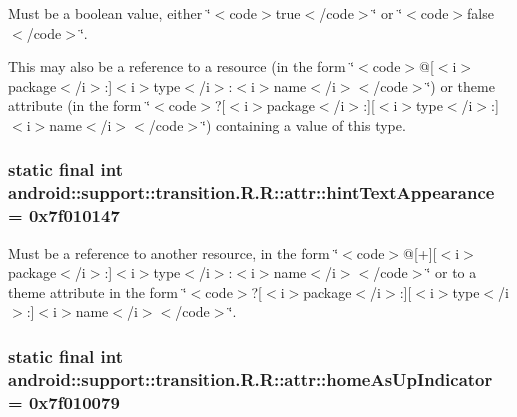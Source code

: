 Must be a boolean value, either \char`\"{}$<$code$>$true$<$/code$>$\char`\"{} or \char`\"{}$<$code$>$false$<$/code$>$\char`\"{}. 

This may also be a reference to a resource (in the form \char`\"{}$<$code$>$@\mbox{[}$<$i$>$package$<$/i$>$:\mbox{]}$<$i$>$type$<$/i$>$:$<$i$>$name$<$/i$>$$<$/code$>$\char`\"{}) or theme attribute (in the form \char`\"{}$<$code$>$?\mbox{[}$<$i$>$package$<$/i$>$:\mbox{]}\mbox{[}$<$i$>$type$<$/i$>$:\mbox{]}$<$i$>$name$<$/i$>$$<$/code$>$\char`\"{}) containing a value of this type. \hypertarget{classandroid_1_1support_1_1transition_1_1_r_1_1attr_cebf97defcf74a193b4e4dfb6aa6bc21}{
\subsubsection[{hintTextAppearance}]{\setlength{\rightskip}{0pt plus 5cm}static final int android::support::transition.R.R::attr::hintTextAppearance = 0x7f010147}}
\label{classandroid_1_1support_1_1transition_1_1_r_1_1attr_cebf97defcf74a193b4e4dfb6aa6bc21}


Must be a reference to another resource, in the form \char`\"{}$<$code$>$@\mbox{[}+\mbox{]}\mbox{[}$<$i$>$package$<$/i$>$:\mbox{]}$<$i$>$type$<$/i$>$:$<$i$>$name$<$/i$>$$<$/code$>$\char`\"{} or to a theme attribute in the form \char`\"{}$<$code$>$?\mbox{[}$<$i$>$package$<$/i$>$:\mbox{]}\mbox{[}$<$i$>$type$<$/i$>$:\mbox{]}$<$i$>$name$<$/i$>$$<$/code$>$\char`\"{}. \hypertarget{classandroid_1_1support_1_1transition_1_1_r_1_1attr_e05e5e3faece6a8edf933e4130bc88e3}{
\subsubsection[{homeAsUpIndicator}]{\setlength{\rightskip}{0pt plus 5cm}static final int android::support::transition.R.R::attr::homeAsUpIndicator = 0x7f010079}}
\label{classandroid_1_1support_1_1transition_1_1_r_1_1attr_e05e5e3faece6a8edf933e4130bc88e3}



